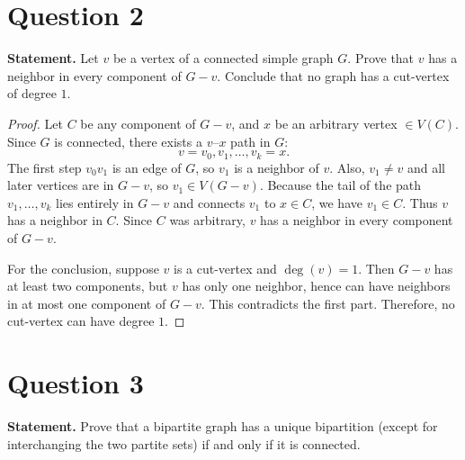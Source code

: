 \documentclass[11pt]{article}
\begin{document}
\newpage

\section*{Question 2}
\textbf{Statement.} Let $v$ be a vertex of a connected simple graph $G$. Prove that $v$ has a neighbor in every component of $G-v$. Conclude that no graph has a cut-vertex of degree $1$.

\begin{proof}
Let $C$ be any component of $G-v$, and $x$ be an arbitrary vertex $\in V(C)$.
Since $G$ is connected, there exists a $v$--$x$ path in $G$:
\[
v=v_0, v_1, \dots, v_k=x.
\]
The first step $v_0v_1$ is an edge of $G$, so $v_1$ is a neighbor of $v$.
Also, $v_1\neq v$ and all later vertices are in $G-v$, so $v_1\in V(G-v)$.
Because the tail of the path $v_1,\dots,v_k$ lies entirely in $G-v$ and connects $v_1$ to $x\in C$, we have $v_1\in C$.
Thus $v$ has a neighbor in $C$. Since $C$ was arbitrary, $v$ has a neighbor in every component of $G-v$.

For the conclusion, suppose $v$ is a cut-vertex and $\deg(v)=1$.
Then $G-v$ has at least two components, but $v$ has only one neighbor, hence can have neighbors in at most one component of $G-v$.
This contradicts the first part. Therefore, no cut-vertex can have degree $1$.
\end{proof}

\newpage

\section*{Question 3}
\textbf{Statement.} Prove that a bipartite graph has a unique bipartition (except for interchanging the two partite sets) if and only if it is connected.
\end{document}
